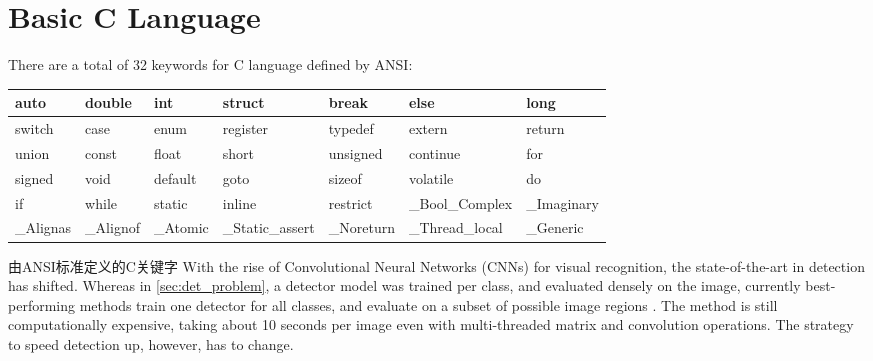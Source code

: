 \chapter{Basic C Language}\label{sec:basic_chapter}


There are a total of 32 keywords for C language defined by ANSI:
\begin{table}
\begin{tabular}{|l|l|l|l|l|}
\hline
auto       & double    & int       & struct           &  break 	     & else 	      & long \\
\hline
switch     & case      & enum      & register         & typedef      & extern         & return \\
\hline
union      & const     & float     & short            & unsigned     & continue       & for  \\
\hline
signed     & void      & default   & goto             & sizeof       & volatile       & do  \\
\hline
if         & while     & static    & inline           & restrict     & _Bool_Complex  & _Imaginary   \\
\hline
_Alignas   & _Alignof  & _Atomic   &  _Static_assert  &   _Noreturn  & _Thread_local  &   _Generic \\
\hline
\end{tabular}
\end{table}


 由ANSI标准定义的C关键字
With the rise of Convolutional Neural Networks (CNNs) for visual recognition, the state-of-the-art in detection has shifted.
Whereas in \autoref{sec:det_problem}, a detector model was trained per class, and evaluated densely on the image, currently best-performing methods train one detector for all classes, and evaluate on a subset of possible image regions \parencite{Girshick-CVPR-2014}.
The method is still computationally expensive, taking about 10 seconds per image even with multi-threaded matrix and convolution operations.
The strategy to speed detection up, however, has to change.





